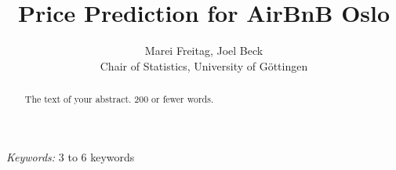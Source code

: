 \begin{titlepage}

\title{\bf Price Prediction for AirBnB Oslo}

\author{Marei Freitag, Joel Beck \hspace{.2cm}\\ Chair of Statistics, University of G\"ottingen\\}

\maketitle

\bigskip

\begin{abstract}
    The text of your abstract.  200 or fewer words.
\end{abstract}

\noindent%
    {\it Keywords:}  3 to 6 keywords
\vfill

\end{titlepage}
